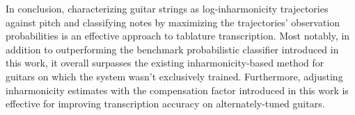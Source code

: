 \documentclass[12pt]{cmuthesis}
\begin{document}
In conclusion, characterizing guitar strings as log-inharmonicity trajectories against pitch and classifying notes by maximizing the trajectories' observation probabilities is an effective approach to tablature transcription. Most notably, in addition to outperforming the benchmark probabilistic classifier introduced in this work, it overall surpasses the existing inharmonicity-based method for guitars on which the system wasn't exclusively trained. Furthermore, adjusting inharmonicity estimates with the compensation factor introduced in this work is effective for improving transcription accuracy on alternately-tuned guitars.




%

\backmatter


\renewcommand{\bibsection}{\chapter{\bibname}}

\end{document}
